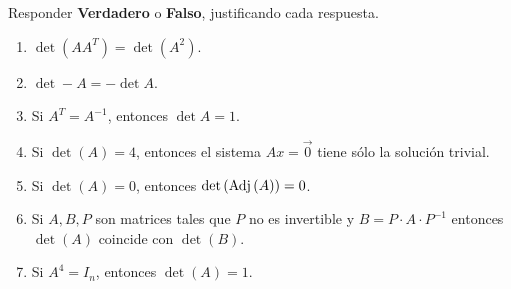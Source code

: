 \item Responder \textbf{Verdadero} o \textbf{Falso}, justificando cada respuesta.
    \begin{enumerate}[label=\listAlph]
        \item \(\det\left(AA^T\right) = \det\left(A^2\right)\).
        \item \(\det -A = -\det A\).
        \item Si \(A^T = A^{-1}\), entonces \(\det A = 1\).
        \item Si \(\det \left(A\right) = 4\), entonces el sistema \(Ax = \vec{0}\) tiene sólo la solución trivial.
        \item Si \(\det \left(A\right) = 0\), entonces \(\det \left( \text{Adj} \left(A\right)\right) = 0\).
        \item Si \(A, B, P\) son matrices tales que \(P\) no es invertible y \(B = P \cdot A \cdot P^{-1}\) entonces \(\det (A)\) coincide con \(\det (B)\).
        \item Si \(A^4 = I_n\), entonces \(\det(A) = 1\).
    \end{enumerate}
